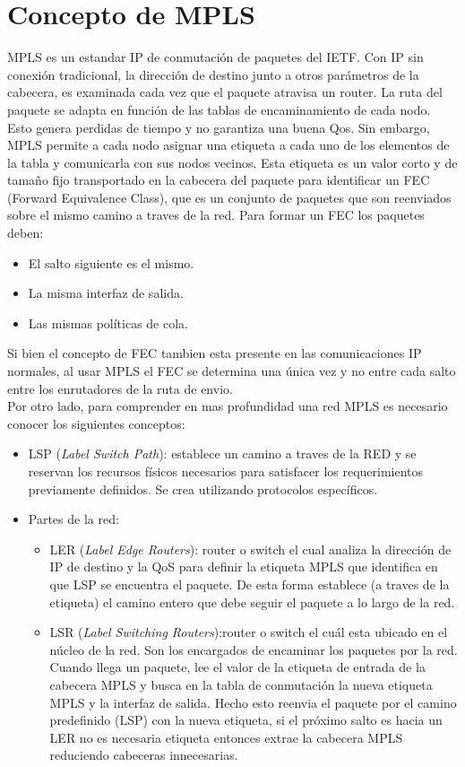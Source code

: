 \documentclass[a4paper]{article}
\begin{document}
\section{Concepto de MPLS}
MPLS es un estandar IP de conmutación de paquetes del IETF. Con IP sin conexión tradicional, la dirección
de destino junto a otros parámetros de la cabecera, es examinada cada vez que el paquete atravisa un router. La ruta
del paquete se adapta en función de las tablas de encaminamiento de cada nodo. Esto genera perdidas de tiempo y no garantiza una buena Qos.
Sin embargo, MPLS permite a cada nodo asignar una etiqueta a cada uno de los elementos de la tabla y comunicarla 
con sus nodos vecinos. Esta etiqueta es un valor corto y de tamaño fijo transportado en la cabecera del paquete para 
identificar un FEC (Forward Equivalence Class), que es un conjunto de paquetes que son reenviados
sobre el mismo camino a traves de la red. Para formar un FEC los paquetes deben:
\begin{itemize}
    \item El salto siguiente es el mismo.
    \item La misma interfaz de salida.
    \item Las mismas políticas de cola.
\end{itemize}
Si bien el concepto de FEC tambien esta presente en las comunicaciones IP normales, al usar MPLS el FEC se determina una única vez y no entre cada 
salto entre los enrutadores de la ruta de envio. \\
Por otro lado, para comprender en mas profundidad una red MPLS es necesario conocer los siguientes conceptos:
\begin{itemize}
    \item LSP (\textit{Label Switch Path}): establece un camino a traves de la RED y se reservan los recursos físicos 
    necesarios para satisfacer los requerimientos previamente definidos. Se crea utilizando protocolos específicos.
    \item Partes de la red:
    \begin{itemize}
        \item LER (\textit{Label Edge Routers}): router o switch el cual analiza la dirección de IP de destino y la QoS para definir la 
        etiqueta MPLS que identifica en que LSP se encuentra el paquete. De esta forma establece (a traves de la etiqueta) el camino entero que debe seguir el paquete 
        a lo largo de la red.
        \item LSR (\textit{Label Switching Routers}):router o switch el cuál esta ubicado en el núcleo de la red. Son los encargados de encaminar los 
        paquetes por la red. Cuando llega un paquete, lee el valor de la etiqueta de entrada de la cabecera MPLS y busca en la tabla de conmutación la nueva etiqueta MPLS y la interfaz de salida. Hecho esto reenvia el 
        paquete por el camino predefinido (LSP) con la nueva etiqueta, si el próximo salto es hacia un LER no es necesaria etiqueta entonces extrae la cabecera MPLS reduciendo cabeceras innecesarias.
    \end{itemize}
\end{itemize}
\end{document}
